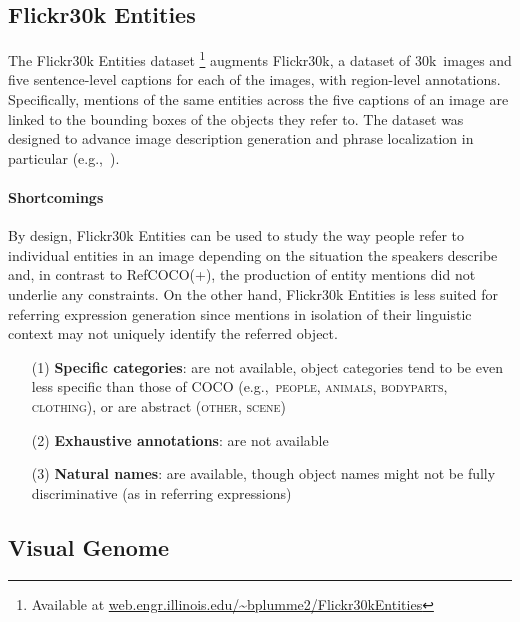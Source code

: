 \documentclass[runningheads]{llncs}
\newcommand{\refcoco}{RefCOCO\xspace}
\newcommand{\flickr}{Flickr30k Entities\xspace}
\newcommand{\cat}[1]{\textsc{#1}}
\begin{document}
\subsection{Flickr30k Entities}
The \flickr dataset \cite{plummer2015flickr30kentities}\footnote{Available at  \url{web.engr.illinois.edu/~bplumme2/Flickr30kEntities}}  augments Flickr30k, a dataset of 30k~images and five sentence-level captions for each of the images, with region-level annotations. 
Specifically, mentions of the same entities across the five captions of an image are linked to the bounding boxes of the objects they refer to. 
The dataset was designed to advance image description generation and phrase localization in particular (e.g.,~\cite{rohrbach2016grounding,plummer2017phrase,yeh2018unsupervised}). 

\paragraph{Shortcomings}

By design, \flickr can be used to study the way people refer to individual entities in an image depending on the situation the speakers describe and,  
in contrast to \refcoco(+), the production of entity mentions did not underlie any constraints. 
On the other hand, \flickr is less suited for referring expression generation since mentions in isolation of their linguistic context may not uniquely identify the referred object. 

\begin{itemize}
     		\item[(1)] \textbf{Specific categories}: are not available, object categories tend to be even less specific than those of COCO (e.g.,~\cat{people, animals, bodyparts, clothing}), or are abstract (\cat{other, scene})
		\item[(2)] \textbf{Exhaustive annotations}: are not available
		   \item[(3)] \textbf{Natural names}: are available, though object names might not be fully discriminative (as in referring expressions)

\end{itemize}


\subsection{Visual Genome}
\end{document}
